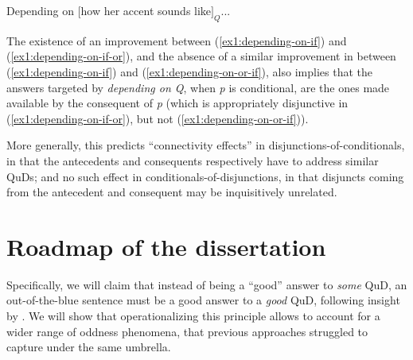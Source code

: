 \begin{exe}
	\ex\label{ex1:depending-on} Depending on $[$how her accent sounds like$]_{Q}$...
	\begin{xlist}
		\label{ex1:depending-on-or}
		 \label{ex1:depending-on-if}
		\label{ex1:depending-on-if-or}
		\label{ex1:depending-on-or-if}
	\end{xlist}
\end{exe}


The existence of an improvement between (\ref{ex1:depending-on-if}) and (\ref{ex1:depending-on-if-or}), and the absence of a similar improvement in between (\ref{ex1:depending-on-if}) and (\ref{ex1:depending-on-or-if}), also implies that the answers targeted by \textit{depending on Q}, when \textit{p} is conditional, are the ones made available by the consequent of \textit{p} (which is appropriately disjunctive in (\ref{ex1:depending-on-if-or}), but not (\ref{ex1:depending-on-or-if})).


More generally, this predicts ``connectivity effects'' in disjunctions-of-conditionals, in that the antecedents and consequents respectively have to address similar QuDs; and no such effect in conditionals-of-disjunctions, in that disjuncts coming from the antecedent and consequent may be inquisitively unrelated.


\section{Roadmap of the dissertation}

Specifically, we will claim that instead of being a ``good'' answer to \textit{some} QuD, an out-of-the-blue sentence must be a good answer to a \textit{good} QuD, following insight by \citet{Katzir2015}. We will show that operationalizing this principle allows to account for a wider range of oddness phenomena, that previous approaches struggled to capture under the same umbrella.

